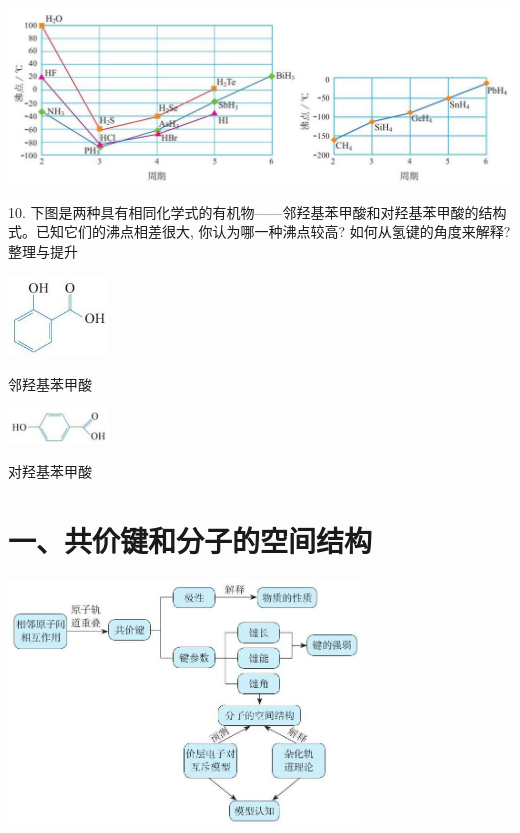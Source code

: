 \documentclass[10pt]{article}
\begin{document}
\begin{center}
\includegraphics[max width=1.0\textwidth]{images/0190e026-5a11-7df7-bd27-54d09026ba7a_66_717979.jpg}
\end{center}

10. 下图是两种具有相同化学式的有机物——邻羟基苯甲酸和对羟基苯甲酸的结构式。已知它们的沸点相差很大, 你认为哪一种沸点较高? 如何从氢键的角度来解释? 整理与提升

\begin{center}
\includegraphics[max width=0.2\textwidth]{images/0190e026-5a11-7df7-bd27-54d09026ba7a_66_632028.jpg}
\end{center}

邻羟基苯甲酸

\begin{center}
\includegraphics[max width=0.2\textwidth]{images/0190e026-5a11-7df7-bd27-54d09026ba7a_66_451137.jpg}
\end{center}

对羟基苯甲酸

\section*{一、共价键和分子的空间结构}

\begin{center}
\includegraphics[max width=0.7\textwidth]{images/0190e026-5a11-7df7-bd27-54d09026ba7a_67_790080.jpg}
\end{center}
\end{document}
